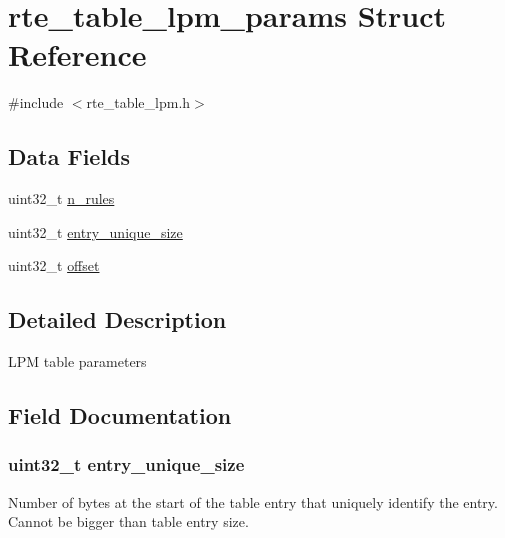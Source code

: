 \hypertarget{structrte__table__lpm__params}{}\section{rte\+\_\+table\+\_\+lpm\+\_\+params Struct Reference}
\label{structrte__table__lpm__params}


{\ttfamily \#include $<$rte\+\_\+table\+\_\+lpm.\+h$>$}

\subsection*{Data Fields}
\begin{DoxyCompactItemize}
\item 
uint32\+\_\+t \hyperlink{structrte__table__lpm__params_a36f832c0360005ce685ffab87c3e188a}{n\+\_\+rules}
\item 
uint32\+\_\+t \hyperlink{structrte__table__lpm__params_ada28744213d85f24111422f3a8b70725}{entry\+\_\+unique\+\_\+size}
\item 
uint32\+\_\+t \hyperlink{structrte__table__lpm__params_a894bdfa2d603d8343f8ef01dda6fcd23}{offset}
\end{DoxyCompactItemize}


\subsection{Detailed Description}
L\+P\+M table parameters 

\subsection{Field Documentation}
\hypertarget{structrte__table__lpm__params_ada28744213d85f24111422f3a8b70725}{}
\subsubsection[{entry\+\_\+unique\+\_\+size}]{\setlength{\rightskip}{0pt plus 5cm}uint32\+\_\+t entry\+\_\+unique\+\_\+size}\label{structrte__table__lpm__params_ada28744213d85f24111422f3a8b70725}
Number of bytes at the start of the table entry that uniquely identify the entry. Cannot be bigger than table entry size. \hypertarget{structrte__table__lpm__params_a36f832c0360005ce685ffab87c3e188a}{}
